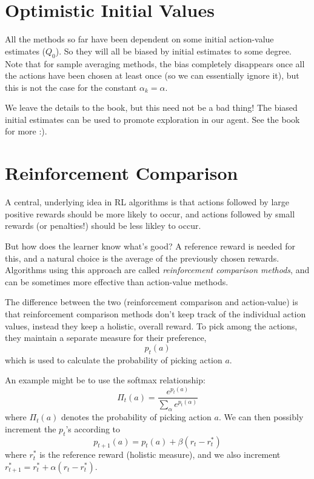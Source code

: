 \documentclass[11pt]{article}
\theoremstyle{definition}
\begin{document}
\section*{\textcolor{CalPolyGreen}{Optimistic Initial Values}}

All the methods so far have been dependent on some initial action-value estimates ($Q_0$).  So they will all be biased by initial estimates to some degree.  Note that for sample averaging methods, the bias completely disappears once all the actions have been chosen at least once (so we can essentially ignore it), but this is not the case for the constant $\alpha_k = \alpha$.

We leave the details to the book, but this need not be a bad thing!  The biased initial estimates can be used to promote exploration in our agent.  See the book for more :).

\section*{\textcolor{CalPolyGreen}{Reinforcement Comparison}}

A central, underlying idea in RL algorithms is that actions followed by large positive rewards should be more likely to occur, and actions followed by small rewards (or penalties!) should be less likley to occur.

But how does the learner know what's good?  A reference reward is needed for this, and a natural choice is the average of the previously chosen rewards.  Algorithms using this approach are called \textit{reinforcement comparison methods}, and can be sometimes more effective than action-value methods.

The difference between the two (reinforcement comparison and action-value) is that reinforcement comparison methods don't keep track of the individual action values, instead they keep a holistic, overall reward.  To pick among the actions, they maintain a separate measure for their preference,
\[
    p_t(a)  
\]
which is used to calculate the probability of picking action $a$.

An example might be to use the softmax relationship:
\[
    \Pi_t(a) = \frac{e^{p_t(a)}}{\sum_\alpha e^{p_t(\alpha)}}
\]
where $\Pi_t(a)$ denotes the probability of picking action $a$.  We can then possibly increment the $p_t$'s according to
\[
    p_{t+1}(a) = p_t(a) + \beta(r_t - r_t^*)
\]
where $r_t^*$ is the reference reward (holistic measure), and we also increment $r_{t+1}^* = r_t^* + \alpha(r_t - r_t^*)$.
\end{document}
